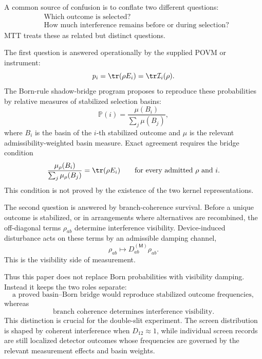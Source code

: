 \documentclass[11pt]{article}
\newcommand{\Meas}{\mathsf M}
\begin{document}
A common source of confusion is to conflate two different questions:
\begin{align}
  &\text{Which outcome is selected?}
  \label{eq:which-outcome}\\
  &\text{How much interference remains before or during selection?}
  \label{eq:how-much-interference}
\end{align}
MTT treats these as related but distinct questions.

The first question is answered operationally by the supplied POVM or instrument:
\[
  p_i=\tr(\rho E_i)=\tr\mathcal I_i(\rho).
\]
The Born-rule shadow-bridge program proposes to reproduce these probabilities by relative
measures of stabilized selection basins:
\begin{equation}
  \mathbb P(i)
  =
  \frac{\mu(B_i)}{\sum_j\mu(B_j)},
  \label{eq:basin-born}
\end{equation}
where \(B_i\) is the basin of the \(i\)-th stabilized outcome and \(\mu\) is the relevant
admissibility-weighted basin measure. Exact agreement requires the bridge condition
\[
  \frac{\mu_\rho(B_i)}{\sum_j\mu_\rho(B_j)}
  =
  \tr(\rho E_i)
  \qquad\text{for every admitted }\rho\text{ and }i.
\]
This condition is not proved by the existence of the two kernel representations.

The second question is answered by branch-coherence survival. Before a unique outcome is
stabilized, or in arrangements where alternatives are recombined, the off-diagonal terms
\(\rho_{ab}\) determine interference visibility. Device-induced disturbance acts on these
terms by an admissible damping channel,
\begin{equation}
  \rho_{ab}\longmapsto D_{ab}^{(\Meas)}\rho_{ab}.
  \label{eq:branch-damping-purpose}
\end{equation}
This is the visibility side of measurement.

Thus this paper does not replace Born probabilities with visibility damping. Instead it keeps
the two roles separate:
\begin{equation}
  \boxed{
  \text{a proved basin--Born bridge would reproduce stabilized outcome frequencies},
  }
\end{equation}
whereas
\begin{equation}
  \boxed{
  \text{branch coherence determines interference visibility}.
  }
\end{equation}
This distinction is crucial for the double-slit experiment. The screen distribution is shaped
by coherent interference when \(D_{12}\approx1\), while individual screen records are still
localized detector outcomes whose frequencies are governed by the relevant measurement
effects and basin weights.
\end{document}
